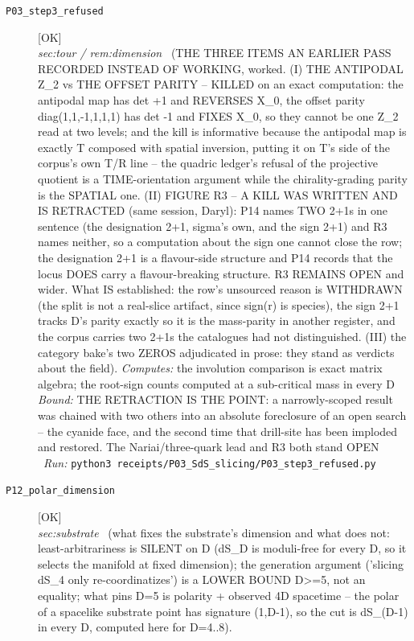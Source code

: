 \begin{description}
\item[\label{rcpt:P03_step3_refused}\texttt{P03\_step3\_refused}]\hfill\textsf{[OK]}\\
\textit{sec:tour / rem:dimension} \ (THE THREE ITEMS AN EARLIER PASS RECORDED INSTEAD OF WORKING, worked. (I) THE ANTIPODAL Z\_2 vs THE OFFSET PARITY -- KILLED on an exact computation: the antipodal map has det +1 and REVERSES X\_0, the offset parity diag(1,1,-1,1,1,1) has det -1 and FIXES X\_0, so they cannot be one Z\_2 read at two levels; and the kill is informative because the antipodal map is exactly T composed with spatial inversion, putting it on T's side of the corpus's own T/R line -- the quadric ledger's refusal of the projective quotient is a TIME-orientation argument while the chirality-grading parity is the SPATIAL one. (II) FIGURE R3 -- A KILL WAS WRITTEN AND IS RETRACTED (same session, Daryl): P14 names TWO 2+1s in one sentence (the designation 2+1, sigma's own, and the sign 2+1) and R3 names neither, so a computation about the sign one cannot close the row; the designation 2+1 is a flavour-side structure and P14 records that the locus DOES carry a flavour-breaking structure. R3 REMAINS OPEN and wider. What IS established: the row's unsourced reason is WITHDRAWN (the split is not a real-slice artifact, since sign(r) is species), the sign 2+1 tracks D's parity exactly so it is the mass-parity in another register, and the corpus carries two 2+1s the catalogues had not distinguished. (III) the category bake's two ZEROS adjudicated in prose: they stand as verdicts about the field). 
\emph{Computes:} the involution comparison is exact matrix algebra; the root-sign counts computed at a sub-critical mass in every D
 \emph{Bound:} THE RETRACTION IS THE POINT: a narrowly-scoped result was chained with two others into an absolute foreclosure of an open search -- the cyanide face, and the second time that drill-site has been imploded and restored. The Nariai/three-quark lead and R3 both stand OPEN
\ \emph{Run:} \texttt{python3 receipts/P03\_SdS\_slicing/P03\_step3\_refused.py}
\item[\label{rcpt:P12_polar_dimension}\texttt{P12\_polar\_dimension}]\hfill\textsf{[OK]}\\
\textit{sec:substrate} \ (what fixes the substrate's dimension and what does not: least-arbitrariness is SILENT on D (dS\_D is moduli-free for every D, so it selects the manifold at fixed dimension); the generation argument ('slicing dS\_4 only re-coordinatizes') is a LOWER BOUND D>=5, not an equality; what pins D=5 is polarity + observed 4D spacetime -- the polar of a spacelike substrate point has signature (1,D-1), so the cut is dS\_(D-1) in every D, computed here for D=4..8). 

\end{description}
